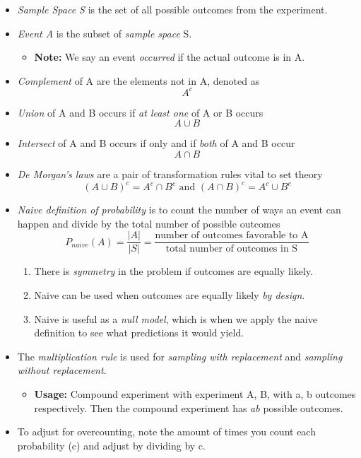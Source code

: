 \documentclass[12pt, letterpaper]{article}
\begin{document}
\begin{itemize}
    \item \textit{Sample Space S} is the set of all possible outcomes from the experiment.
    \item \textit{Event A} is the subset of \emph{sample space} S.
    \begin{itemize}
        \item \textbf{Note:} We say an event \textit{occurred} if the actual outcome is in A.
    \end{itemize}
    \item \textit{Complement} of A are the elements not in A, denoted as \[A^{c}\]
    \item \textit{Union} of A and B occurs if \textit{at least one} of A or B occurs \[A \cup B\]
    \item \textit{Intersect} of A and B occurs if only and if \textit{both} of A and B occur \[A \cap B\]
    \item \textit{De Morgan's laws} are a pair of transformation rules vital to set theory \[(A\cup B)^{c} = A^{c}\cap B^{c}\text{ and } (A\cap B)^{c} = A^{c}\cup B^{c}\]
    \item \textit{Naive definition of probability} is to count the number of ways an event can happen and divide by the total number of possible outcomes \[P_{naive}(A) = \frac{|A|}{|S|} = \frac{\text{number of outcomes favorable to A}}{\text{total number of outcomes in S}} \]
    \begin{enumerate}
        \item There is \textit{symmetry} in the problem if outcomes are equally likely.
        \item Naive can be used when outcomes are equally likely \textit{by design}.
        \item Naive is useful as a \textit{null model}, which is when we apply the naive definition to see what predictions it would yield.
    \end{enumerate}
    \item The \textit{multiplication rule} is used for \textit{sampling with replacement} and \textit{sampling without replacement}.
    \begin{itemize}
        \item \textbf{Usage:} Compound experiment with experiment A, B, with a, b outcomes respectively. Then the compound experiment has \textit{ab} possible outcomes.
    \end{itemize}
    \item To adjust for overcounting, note the amount of times you count each probability (c) and adjust by dividing by c.

\end{itemize}
\end{document}
